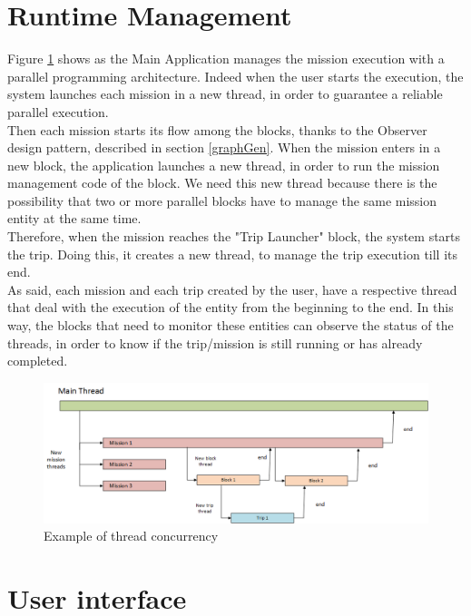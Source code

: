 \section{Runtime Management}\label{runtimeMng}

Figure 	\ref{fig:threads} shows as the Main Application manages the mission execution with a parallel programming architecture. 
Indeed when the user starts the execution, the system launches each mission in a new thread, in order to guarantee a reliable parallel execution.
\\

Then each mission starts its flow among the blocks, thanks to the Observer design pattern, described in section \ref{graphGen}.
When the mission enters in a new block, the application launches a new thread, in order to run the mission management code of the block.
We need this new thread because there is the possibility that two or more parallel blocks have to manage the same mission entity at the same time.
\\

Therefore, when the mission reaches the "Trip Launcher" block, the system starts the trip.
Doing this, it creates a new thread, to manage the trip execution till its end.
\\

As said, each mission and each trip created by the user, have a respective thread that deal with the execution of the entity from the beginning to the end. In this way, the blocks that need to monitor these entities can observe the status of the threads, in order to know if the trip/mission is still running or has already completed.
\\

 \begin{figure}[h!]
 \includegraphics[width=\linewidth]
 {pictures/threads.png}
 \caption{Example of thread concurrency}
 \label{fig:threads}
 \end{figure}

\section{User interface}\label{interface}

